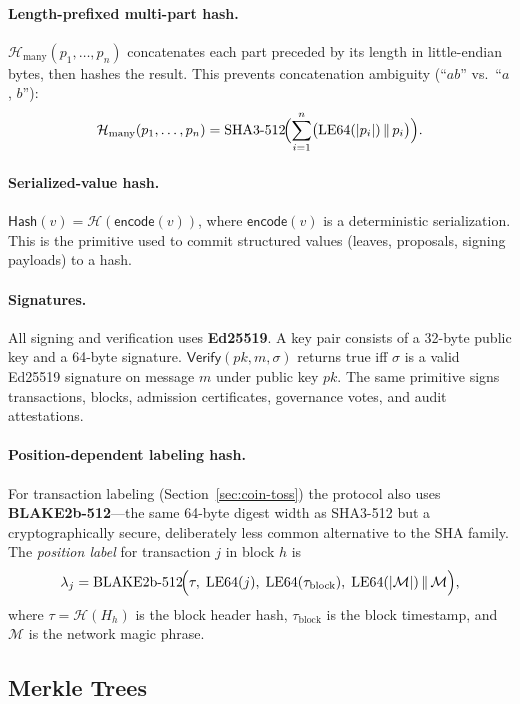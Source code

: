 \documentclass[11pt,a4paper]{article}
\theoremstyle{definition}
\newcommand{\hash}{\mathcal{H}}
\newcommand{\hashvalue}{\mathsf{Hash}}
\newcommand{\verify}{\mathsf{Verify}}
\begin{document}
\paragraph{Length-prefixed multi-part hash.}
$\hash_{\mathrm{many}}(p_1,\dots,p_n)$ concatenates each part preceded by its
length in little-endian bytes, then hashes the result.  This prevents
concatenation ambiguity (``$ab$'' vs.\ ``$a$, $b$''):
\[
\hash_{\mathrm{many}}(p_1,\dots,p_n)
  = \mathrm{SHA3\text{-}512}\!\Bigl(\sum_{i=1}^{n}
  \bigl(\mathrm{LE64}(|p_i|)\,\|\,p_i\bigr)\Bigr).
\]

\paragraph{Serialized-value hash.}
$\hashvalue(v) = \hash(\mathsf{encode}(v))$, where $\mathsf{encode}(v)$ is a
deterministic serialization.  This is the primitive used to commit structured
values (leaves, proposals, signing payloads) to a hash.

\paragraph{Signatures.}
All signing and verification uses \textbf{Ed25519}.  A key pair consists of a
32-byte public key and a 64-byte signature.  $\verify(pk, m, \sigma)$ returns
true iff $\sigma$ is a valid Ed25519 signature on message $m$ under public key
$pk$.  The same primitive signs transactions, blocks, admission certificates,
governance votes, and audit attestations.

\paragraph{Position-dependent labeling hash.}
For transaction labeling (Section~\ref{sec:coin-toss}) the protocol also uses
\textbf{BLAKE2b-512}---the same 64-byte digest width as SHA3-512 but a
cryptographically secure, deliberately less common alternative to the SHA
family.  The \emph{position label} for transaction $j$ in block $h$ is
\[
\lambda_j = \mathrm{BLAKE2b\text{-}512}\!\Bigl(
  \tau,\; \mathrm{LE64}(j),\; \mathrm{LE64}(\tau_{\mathrm{block}}),\;
  \mathrm{LE64}(|\mathcal{M}|)\,\|\,\mathcal{M}
\Bigr),
\]
where $\tau = \hash(H_h)$ is the block header hash, $\tau_{\mathrm{block}}$ is
the block timestamp, and $\mathcal{M}$ is the network magic phrase.

\subsection{Merkle Trees}
\label{sec:merkle}
\end{document}
